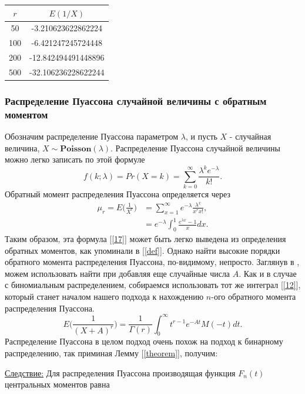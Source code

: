 \documentclass[13pt]{article}
\begin{document}
\begin{center}
\begin{tabular}{|c|c|}
\hline
    $r$ & $E(1/X)$ \\
    \hline
     50 &  -3.210623622862224 \\
     100 & -6.421247245724448 \\
     200 & -12.842494491448896 \\
     500 & -32.106236228622244 \\  
     \hline 
\end{tabular}
   
\end{center}

\newpage


\subsubsection{Распределение Пуассона случайной величины с обратным моментом}\label{subsection 2.3}
Обозначим распределение Пуассона параметром $\lambda$, и пусть $X$ - случайная величина, $X \sim \textbf{Poisson}(\lambda)$. Распределение Пуассона случайной величины можно легко записать по этой формуле
\begin{equation}
    f(k;\lambda)= Pr(X=k) =\sum_{k=0}^{\infty} \frac{\lambda^{k}e^{-\lambda}}{k!}.
\end{equation}
Обратный момент распределения Пуассона определяется через 
\begin{align}\label{17}
        \mu_r = E\Big(\frac{1}{X^{r}}\Big) &=  \sum_{x=1}^{\infty}e^{-\lambda} \frac{\lambda^{x}}{x^{r}x!} ,\\
        &= e^{-\lambda}\int_{0}^{1}\frac{e^{\lambda x}-1}{x}dx.
\end{align}
Таким образом, эта формула [\ref{17}] может быть легко выведена из определения обратных моментов, как упоминали в [\ref{def}]. Однако найти высокие порядки обратного момента распределения Пуассона, по-видимому, непросто. Заглянув в \cite{chao1972negative}, можем использовать найти при добавляя еще случайные числа $A$. Как и в случае с биномиальным распределением, собираемся использовать тот же интеграл [\ref{12}], который станет началом нашего подхода к нахождению $n$-ого обратного момента распределения Пуассона. 
\[
  E\Big(\frac{1}{(X+A)^{r}}\Big) = \frac{1}{\Gamma(r)}\int_{0}^{\infty}t^{r-1}e^{-At}M(-t)dt. 
\]
Распределение Пуассона в целом подход очень похож на подход к бинарному распределению, так приминая Лемму [\ref{theorem}], получим:\par
\underline{Следствие:} Для распределения Пуассона производящая функция $F_{n}(t)$ центральных моментов равна
\end{document}
